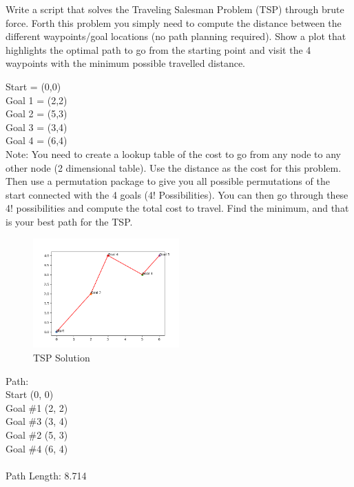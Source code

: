 \documentclass{article}
\begin{document}
Write a script that solves the Traveling Salesman Problem (TSP) through brute force. Forth this
problem you simply need to compute the distance between the different waypoints/goal locations
(no path planning required). Show a plot that highlights the optimal path to go from the starting
point and visit the 4 waypoints with the minimum possible travelled distance.

\bigskip
\noindent Start = (0,0) \\
Goal 1 = (2,2)\\
Goal 2 = (5,3)\\
Goal 3 = (3,4)\\
Goal 4 = (6,4)\\

\bigskip
Note: You need to create a lookup table of the cost to go from any node to any other node (2
dimensional table). Use the distance as the cost for this problem. Then use a permutation package to
give you all possible permutations of the start connected with the 4 goals (4! Possibilities). You can
then go through these 4! possibilities and compute the total cost to travel. Find the minimum, and
that is your best path for the TSP.


\begin{figure}[h]
    \centering
    \includegraphics[width=0.5\textwidth]{question3.png}
    \caption*{TSP Solution}
    \label{fig:tsp}
\end{figure}

\noindent Path: \\
\indent Start (0, 0) \\
\indent Goal \#1 (2, 2) \\
\indent Goal \#3 (3, 4) \\
\indent Goal \#2 (5, 3) \\
\indent Goal \#4 (6, 4) \\ \\ 
Path Length: 8.714 \\
\end{document}
